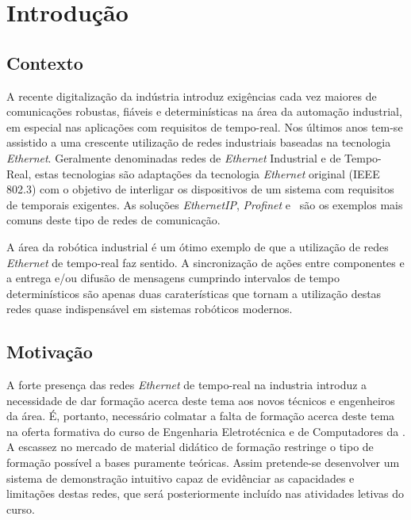 \chapter{Introdução} \label{chap:intro}




\section{Contexto}\label{sec:contexto}

A recente digitalização da indústria introduz exigências cada vez maiores
de comunicações robustas, fiáveis e determinísticas na área da automação
industrial, em especial nas aplicações com requisitos de tempo-real.
Nos últimos anos tem-se assistido a uma crescente utilização de redes
industriais baseadas na tecnologia \textit{Ethernet}. Geralmente
denominadas redes de \textit{Ethernet} Industrial e de Tempo-Real, estas
tecnologias são adaptações da tecnologia \textit{Ethernet} original (IEEE
802.3) com o objetivo de interligar os dispositivos de um sistema com
requisitos de temporais exigentes. As soluções \textit{EthernetIP},
\textit{Profinet} e \ecat\ são os exemplos mais comuns deste tipo de redes
de comunicação.

A área da robótica industrial é um ótimo exemplo de que a utilização de
redes \textit{Ethernet} de tempo-real faz sentido. A sincronização de
ações entre componentes e a entrega e/ou difusão de mensagens cumprindo
intervalos de tempo determinísticos são apenas duas caraterísticas que
tornam a utilização destas redes quase indispensável em sistemas robóticos
modernos.


\section{Motivação}\label{sec:motivacao}

A forte presença das redes \textit{Ethernet} de tempo-real na industria
introduz a necessidade de dar formação acerca deste tema aos novos
técnicos e engenheiros da área. É, portanto, necessário colmatar a falta
de formação acerca deste tema na oferta formativa do curso de Engenharia
Eletrotécnica e de Computadores da \Feup. A escassez no mercado de material didático de
formação restringe o tipo de formação possível a bases puramente teóricas.
Assim pretende-se desenvolver um sistema de demonstração intuitivo capaz
de evidênciar as capacidades e limitações destas redes, que será
posteriormente incluído nas atividades letivas do curso.

